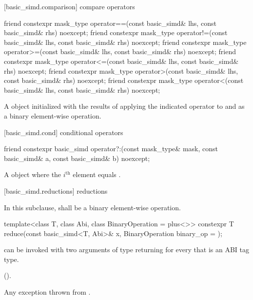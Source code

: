 [basic_simd.comparison]{ compare operators}

\begin{itemdecl}
friend constexpr mask_type operator==(const basic_simd& lhs, const basic_simd& rhs) noexcept;
friend constexpr mask_type operator!=(const basic_simd& lhs, const basic_simd& rhs) noexcept;
friend constexpr mask_type operator>=(const basic_simd& lhs, const basic_simd& rhs) noexcept;
friend constexpr mask_type operator<=(const basic_simd& lhs, const basic_simd& rhs) noexcept;
friend constexpr mask_type operator>(const basic_simd& lhs, const basic_simd& rhs) noexcept;
friend constexpr mask_type operator<(const basic_simd& lhs, const basic_simd& rhs) noexcept;
\end{itemdecl}

\begin{itemdescr}
  \pnum\ConstraintOperatorTWellFormed

  \pnum\returns
  A  object initialized with the results of applying the indicated operator to  and  as a binary element-wise operation.
\end{itemdescr}

[basic_simd.cond]{ conditional operators}

\begin{itemdecl}
friend constexpr basic_simd operator?:(const mask_type& mask, const basic_simd& a, const basic_simd& b) noexcept;
\end{itemdecl}

\begin{itemdescr}
  \pnum\returns
  A  object where the $i^\text{th}$ element equals  \foralli.
\end{itemdescr}
[basic_simd.reductions]{ reductions}

\pnum
In this subclause,  shall be a binary element-wise operation.

\begin{itemdecl}
template<class T, class Abi, class BinaryOperation = plus<>>
  constexpr T reduce(const basic_simd<T, Abi>& x, BinaryOperation binary_op = {});
\end{itemdecl}

\begin{itemdescr}
  \pnum\mandates
   can be invoked with two arguments of type  returning  for every  that is an ABI tag type.

  \pnum\returns
   \foralli ().

  \pnum\throws
  Any exception thrown from .
\end{itemdescr}

